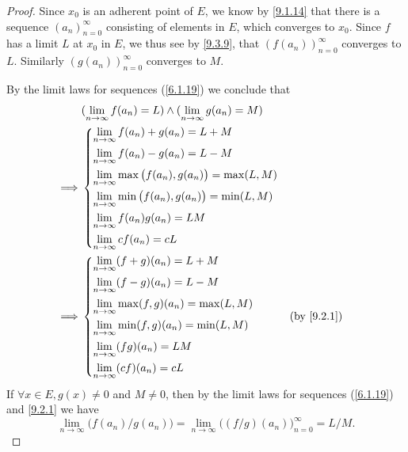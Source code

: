 \begin{proof}
  Since \(x_0\) is an adherent point of \(E\), we know by \cref{9.1.14} that there is a sequence \((a_n)_{n = 0}^\infty\) consisting of elements in \(E\), which converges to \(x_0\).
  Since \(f\) has a limit \(L\) at \(x_0\) in \(E\), we thus see by \cref{9.3.9}, that \((f(a_n))_{n = 0}^\infty\) converges to \(L\).
  Similarly \((g(a_n))_{n = 0}^\infty\) converges to \(M\).

  By the limit laws for sequences (\cref{6.1.19}) we conclude that
  \begin{align*}
             & (\lim_{n \to \infty} f(a_n) = L) \land (\lim_{n \to \infty} g(a_n) = M) \\
    \implies & \begin{dcases}
                 \lim_{n \to \infty} f(a_n) + g(a_n) = L + M                   \\
                 \lim_{n \to \infty} f(a_n) - g(a_n) = L - M                   \\
                 \lim_{n \to \infty} \max\big(f(a_n), g(a_n)\big) = \max(L, M) \\
                 \lim_{n \to \infty} \min\big(f(a_n), g(a_n)\big) = \min(L, M) \\
                 \lim_{n \to \infty} f(a_n) g(a_n) = LM                        \\
                 \lim_{n \to \infty} cf(a_n) = cL
               \end{dcases}           \\
    \implies & \begin{dcases}
                 \lim_{n \to \infty} (f + g)(a_n) = L + M         \\
                 \lim_{n \to \infty} (f - g)(a_n) = L - M         \\
                 \lim_{n \to \infty} \max(f, g)(a_n) = \max(L, M) \\
                 \lim_{n \to \infty} \min(f, g)(a_n) = \min(L, M) \\
                 \lim_{n \to \infty} (fg)(a_n) = LM               \\
                 \lim_{n \to \infty} (cf)(a_n) = cL
               \end{dcases}                     &  & \by{9.2.1}
  \end{align*}
  If \(\forall x \in E, g(x) \neq 0\) and \(M \neq 0\), then by the limit laws for sequences (\cref{6.1.19}) and \cref{9.2.1} we have
  \[
    \lim_{n \to \infty} \big(f(a_n) / g(a_n)\big) = \lim_{n \to \infty} \big((f / g)(a_n)\big)_{n = 0}^\infty = L / M.
\]
\end{proof}
